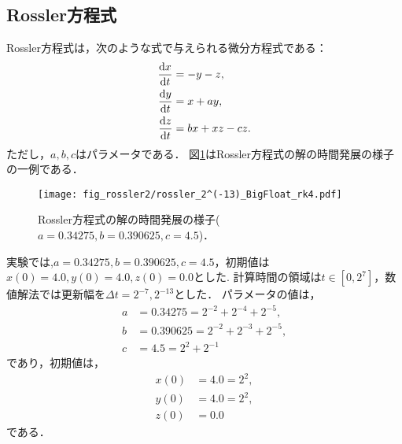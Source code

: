 \subsection{Rossler方程式}
Rossler方程式は，次のような式で与えられる微分方程式である：
\begin{align*}
    \frac{\mathrm{d}x}{\mathrm{d}t} &= -y-z, \\
    \frac{\mathrm{d}y}{\mathrm{d}t} &= x+ay, \\
    \frac{\mathrm{d}z}{\mathrm{d}t} &= bx + xz - cz.
\end{align*}
ただし，$a,b,c$はパラメータである．
図\ref{fig:rossler}はRossler方程式の解の時間発展の様子の一例である．
\begin{figure}[H]
    \centering
    \texttt{[image: fig\_rossler2/rossler\_2^(-13)\_BigFloat\_rk4.pdf]}
    \caption{Rossler方程式の解の時間発展の様子($a=0.34275, b=0.390625, c=4.5$)．}
    \label{fig:rossler}
\end{figure}
実験では,$a=0.34275, b=0.390625, c=4.5$，初期値は$x(0) = 4.0, y(0) = 4.0, z(0) = 0.0$とした.
計算時間の領域は$t \in [0, 2^7]$，数値解法では更新幅を$\Delta t =   2^{-7},2^{-13}$とした．
パラメータの値は，
\begin{align*}
    a &= 0.34275 = 2^{-2} + 2^{-4} + 2^{-5},\\
    b &= 0.390625 = 2^{-2} + 2^{-3} + 2^{-5},\\ 
    c &= 4.5 = 2^2 + 2^{-1}
\end{align*}
であり，初期値は，
\begin{align*}
    x(0) &= 4.0 = 2^2,\\
    y(0) &= 4.0 = 2^2 ,\\
    z(0) &= 0.0 
\end{align*}
である．
